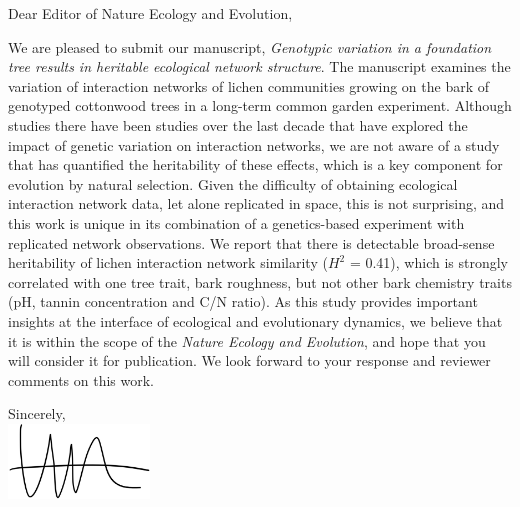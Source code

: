 \documentclass[12pt, a4paper]{letter} %
\begin{document}

\begin{letter}{

}


\opening{Dear Editor of Nature Ecology and Evolution,}


We are pleased to submit our manuscript, \textit{Genotypic variation
  in a foundation tree results in heritable ecological network
  structure}. The manuscript examines the variation of interaction
networks of lichen communities growing on the bark of genotyped
cottonwood trees in a long-term common garden experiment. Although
studies there have been studies over the last decade that have
explored the impact of genetic variation on interaction networks, we
are not aware of a study that has quantified the heritability of these
effects, which is a key component for evolution by natural
selection. Given the difficulty of obtaining ecological interaction
network data, let alone replicated in space, this is not surprising,
and this work is unique in its combination of a genetics-based
experiment with replicated network observations. We report that there
is detectable broad-sense heritability of lichen interaction network
similarity ($H^2$ = 0.41), which is strongly correlated with one tree
trait, bark roughness, but not other bark chemistry traits (pH, tannin
concentration and C/N ratio). As this study provides important
insights at the interface of ecological and evolutionary dynamics, we
believe that it is within the scope of the \textit{Nature Ecology and
  Evolution}, and hope that you will consider it for publication. We
look forward to your response and reviewer comments on this work.


\closing{Sincerely, \\
  \hbox{\hspace{-10cm}}
\includegraphics[height=2cm]{mkl_sig.pdf}  
}





\end{letter}
\end{document}
